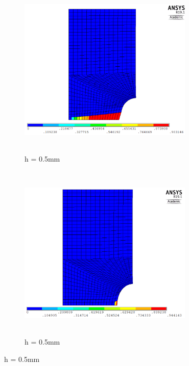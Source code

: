 \documentclass[a4paper,12pt,twoside]{report}
\begin{document}
\begin{figure}[htbp!]\ContinuedFloat 
     \begin{subfigure}{0.4\textwidth}
         \includegraphics[width=8.3cm,height=8.5cm,keepaspectratio]{25.d1-0.5-r.png}
         \caption{h = 0.5mm}
         \label{fig:d1-0.5-r}
     \end{subfigure}   
     \hspace{1.8cm}
     \begin{subfigure}{0.4\textwidth}
         \includegraphics[width=8.3cm,height=8.5cm,keepaspectratio]{25.d1-0.5-nr.png}
         \caption{h = 0.5mm}
         \label{fig:d1-0.5-nr}
     \end{subfigure}
\end{figure}
\FloatBarrier
\end{document}
